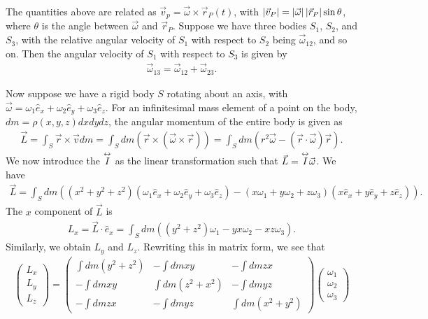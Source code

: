 The quantities above are related as $\vec{v}_{p} = \vec{\omega} \times \vec{r}_{P}(t)$, with $\left| \vec{v}_{P} \right| = \left| \vec{\omega} \right| \left| \vec{r}_{P} \right| \sin \theta$, where $\theta$ is the angle between $\vec{\omega}$ and $\vec{r}_{P}$. Suppose we have three bodies $S_{1}$, $S_{2}$, and $S_{3}$, with the relative angular velocity of $S_{1}$ with respect to $S_{2}$ being $\vec{\omega}_{12}$, and so on. Then the angular velocity of $S_{1}$ with respect to $S_{3}$ is given by
\begin{align}
    \vec{\omega}_{13} = \vec{\omega}_{12} + \vec{\omega}_{23}.
\end{align}

Now suppose we have a rigid body $S$ rotating about an axis, with $\vec{\omega} = \omega_{1} \hat{e}_{x} + \omega_{2} \hat{e}_{y} + \omega_{3} \hat{e}_{z}$. For an infinitesimal mass element of a point on the body, $dm = \rho(x,y,z) dx dy dz$, the angular momentum of the entire body is given as
\begin{align}
    \vec{L} = \int_{S} \vec{r} \times \vec{v} dm = \int_{S} dm(\vec{r} \times (\vec{\omega} \times \vec{r})) = \int_{S} dm \left( r^{2} \vec{\omega} - (\vec{r} \cdot \vec{\omega}) \vec{r} \right).
\end{align}
We now introduce the  $\overset{\leftrightarrow}{I}$ as the linear transformation such that $\vec{L} = \overset{\leftrightarrow}{I} \vec{\omega}$. We have
\begin{align}
    \vec{L} = \int_{S} dm \left( (x^{2}+y^{2}+z^{2})(\omega_{1} \hat{e}_{x} + \omega_{2} \hat{e}_{y} + \omega_{3} \hat{e}_{z}) - (x\omega_{1} + y\omega_{2} + z\omega_{3})(x\hat{e}_{x} + y\hat{e}_{y} + z\hat{e}_{z}) \right).
\end{align}
The $x$ component of $\vec{L}$ is
\begin{align}
    L_{x} = \vec{L} \cdot \hat{e}_{x} = \int_{S} dm \left( (y^{2}+z^{2}) \omega_{1} - yx \omega_{2} - xz \omega_{3} \right).
\end{align}
Similarly, we obtain $L_{y}$ and $L_{z}$. Rewriting this in matrix form, we see that
\begin{align}
    \begin{pmatrix}
        L_{x} \\ L_{y} \\ L_{z}
    \end{pmatrix} = \begin{pmatrix}
        \int dm (y^{2}+z^{2}) & - \int dm xy & - \int dm zx \\
        -\int dm xy & \int dm (z^{2}+x^{2}) & - \int dm yz \\
        -\int dm zx & - \int dm yz & \int dm (x^{2}+y^{2})
    \end{pmatrix} \begin{pmatrix}
        \omega_{1} \\ \omega_{2} \\ \omega_{3}
    \end{pmatrix}
\end{align}
